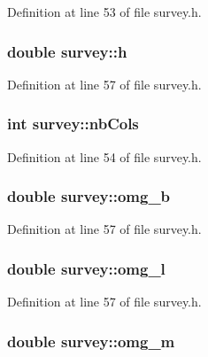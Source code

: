 Definition at line 53 of file survey.h.

\hypertarget{modulesurvey_aaf7661ce71838ee82daf689fa3376e50}{
\subsubsection[{h}]{\setlength{\rightskip}{0pt plus 5cm}double {\bf survey::h}}}
\label{modulesurvey_aaf7661ce71838ee82daf689fa3376e50}


Definition at line 57 of file survey.h.

\hypertarget{modulesurvey_a25e30c3a15c8da2d421a85cd18f8e6ed}{
\subsubsection[{nbCols}]{\setlength{\rightskip}{0pt plus 5cm}int {\bf survey::nbCols}}}
\label{modulesurvey_a25e30c3a15c8da2d421a85cd18f8e6ed}


Definition at line 54 of file survey.h.

\hypertarget{modulesurvey_a4125c25d288280ab388ce51932f20bb4}{
\subsubsection[{omg\_\-b}]{\setlength{\rightskip}{0pt plus 5cm}double {\bf survey::omg\_\-b}}}
\label{modulesurvey_a4125c25d288280ab388ce51932f20bb4}


Definition at line 57 of file survey.h.

\hypertarget{modulesurvey_a0bd34c61702e99cc51bc42e60b27addb}{
\subsubsection[{omg\_\-l}]{\setlength{\rightskip}{0pt plus 5cm}double {\bf survey::omg\_\-l}}}
\label{modulesurvey_a0bd34c61702e99cc51bc42e60b27addb}


Definition at line 57 of file survey.h.

\hypertarget{modulesurvey_a80706db19f844bda5bb06fcded22c3d3}{
\subsubsection[{omg\_\-m}]{\setlength{\rightskip}{0pt plus 5cm}double {\bf survey::omg\_\-m}}}
\label{modulesurvey_a80706db19f844bda5bb06fcded22c3d3}


